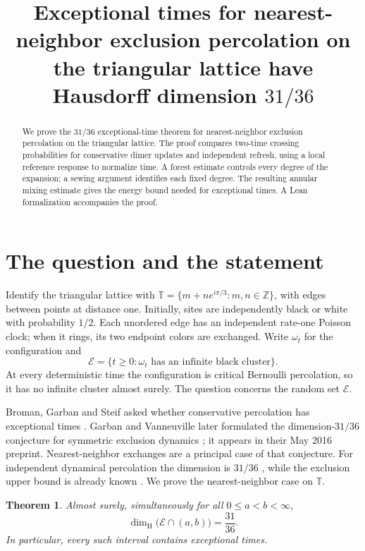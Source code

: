 \documentclass[11pt]{article}
\title{Exceptional times for nearest-neighbor exclusion percolation on the triangular lattice have Hausdorff dimension $31/36$}
\author{}
\date{}
\makeatletter
\newtheorem{theorem}{Theorem}
\newcommand{\T}{\mathbb T}
\newcommand{\dimH}{\dim_{\mathrm H}}
\renewcommand{\maketitle}{\begin{center}{\Large\bfseries\@title\par}\end{center}\vspace{0.5em}}
\makeatother
\begin{document}
\maketitle

\begin{abstract}
We prove the $31/36$ exceptional-time theorem for
nearest-neighbor exclusion percolation on the triangular lattice. The
proof compares two-time crossing probabilities for conservative dimer
updates and independent refresh, using a local reference response to
normalize time. A forest estimate controls every degree of the expansion;
a sewing argument identifies each fixed degree. The resulting annular
mixing estimate gives the energy bound needed for exceptional times.
A Lean formalization accompanies the proof.
\end{abstract}

\section{The question and the statement}

Identify the triangular lattice with
$\T=\{m+n e^{i\pi/3}:m,n\in\mathbb Z\}$, with edges between points at
distance one. Initially, sites are independently black or white with
probability $1/2$. Each unordered edge has an independent rate-one Poisson
clock; when it rings, its two endpoint colors are exchanged. Write
$\omega_t$ for the configuration and
\[
 \mathcal E=\{t\geq0:\omega_t\text{ has an infinite black cluster}\}.
\]
At every deterministic time the configuration is critical Bernoulli
percolation, so it has no infinite cluster almost surely. The question
concerns the random set $\mathcal E$.

Broman, Garban and Steif asked whether conservative percolation has
exceptional times \cite[Section 9.4]{BGS}. Garban and Vanneuville later
formulated the dimension-$31/36$ conjecture for symmetric exclusion
dynamics \cite[Conjecture 1.7]{GV}; it appears in their May 2016 preprint.
Nearest-neighbor exchanges are a principal case of that conjecture.
For independent dynamical percolation the dimension is $31/36$
\cite[Theorem 1.4(1)]{GPSspectral}, while the exclusion upper bound is already known
\cite[Proposition 3.3]{GV}. We prove the nearest-neighbor case on $\T$.

\begin{theorem}\label{thm:main}
Almost surely, simultaneously for all $0\leq a<b<\infty$,
\[
             \dimH\bigl(\mathcal E\cap(a,b)\bigr)=\frac{31}{36}.
\]
In particular, every such interval contains exceptional times.
\end{theorem}
\end{document}
